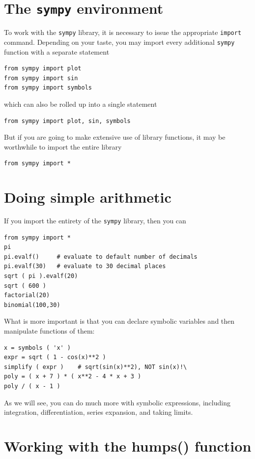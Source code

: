 \documentclass{article}
\begin{document}
\section{The {\tt{sympy}} environment}

To work with the {\tt{sympy}} library, it is necessary to issue
the appropriate {\tt{import}} command.
Depending on your taste, you may import every additional
{\tt{sympy}} function with a separate statement
\begin{lstlisting}[numbers=none]
from sympy import plot
from sympy import sin
from sympy import symbols
\end{lstlisting}
which can also be rolled up into a single statement
\begin{lstlisting}[numbers=none]
from sympy import plot, sin, symbols
\end{lstlisting}
\vskip 0.1in
But if you are going to make extensive use of library
functions, it may be worthwhile to import the entire library
\begin{lstlisting}[numbers=none]
from sympy import *
\end{lstlisting}

\section{Doing simple arithmetic}

If you import the entirety of the {\tt{sympy}} library, then
you can 
\begin{lstlisting}[numbers=none]
from sympy import *
pi
pi.evalf()     # evaluate to default number of decimals
pi.evalf(30)   # evaluate to 30 decimal places
sqrt ( pi ).evalf(20)
sqrt ( 600 )
factorial(20)
binomial(100,30)
\end{lstlisting}
What is more important is that you can declare symbolic variables
and then manipulate functions of them:
\begin{lstlisting}[numbers=none]
x = symbols ( 'x' )
expr = sqrt ( 1 - cos(x)**2 )
simplify ( expr )    # sqrt(sin(x)**2), NOT sin(x)!\
poly = ( x + 7 ) * ( x**2 - 4 * x + 3 )
poly / ( x - 1 )
\end{lstlisting}
As we will see, you can do much more with symbolic expressions,
including integration, differentiation, series expansion, 
and taking limits.  

\section{Working with the humps() function}
\end{document}
